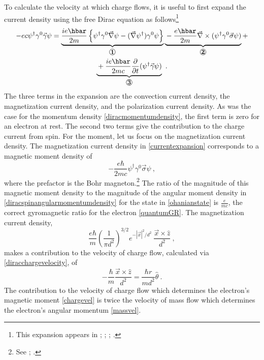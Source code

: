 \documentclass[12pt,secnumarabic,amsmath,amssymb,balancelastpage,nofootinbib]{article}
\begin{document}
To calculate the velocity at which charge flows, it is useful to first expand the current density using the free Dirac equation as follows\footnote{This expansion appears in \citet{gordon1928}; \citet[pg.\ 321--322]{frenkel}; \citet[pg.\ 479]{huang1952}; \citet[pg.\ 504]{ohanian}.}
 \begin{multline}
 -e c \psi^\dagger \gamma^{0} \vec{\gamma} \psi = \underbrace{\strut \frac{i e\hbar}{2 m}\left\{\psi^\dagger \gamma^0 \vec{\nabla} \psi - (\vec{\nabla} \psi^\dagger) \gamma^0\psi\right\}}_{\text{\large{\ding{172}}}}\underbrace{\strut  - \frac{e\hbar}{2 m} \vec{\nabla}\times(\psi^\dagger \gamma^0 \vec{\sigma}\psi)}_{\text{\large{\ding{173}}}} + \\
 \underbrace{\strut  +\frac{i e\hbar}{2 m c}\frac{\partial}{\partial t}(\psi^\dagger \vec{\gamma} \psi)}_{\text{\large{\ding{174}}}}\ .
\label{currentexpansion}
 \end{multline}
The three terms in the expansion are the convection current density, the magnetization current density, and the polarization current density.  As was the case for the momentum density \eqref{diracmomentumdensity}, the first term is zero for an electron at rest.  The second two terms give the contribution to the charge current from spin.  For the moment, let us focus on the magnetization current density.  The magnetization current density in \eqref{currentexpansion} corresponds to a magnetic moment density of
\begin{equation}
- \frac{e\hbar}{2 m c} \psi^\dagger \gamma^0 \vec{\sigma}\psi\ ,
\label{magneticmomentdensity}
\end{equation}
where the prefactor is the Bohr magneton.\footnote{See \citet[section 5.6]{jackson}; \citet[pg. 504]{ohanian}.}  The ratio of the magnitude of this magnetic moment density to the magnitude of the angular moment density in \eqref{diracspinangularmomentumdensity} for the state in \eqref{ohanianstate} is $\frac{e}{m c}$, the correct gyromagnetic ratio for the electron \eqref{quantumGR}.  The magnetization current density,
\begin{equation}
\frac{e \hbar}{m}\left(\frac{1}{\pi d^2}\right)^{3/2}e^{-|\vec{x}|^2/d^2}\ \frac{\vec{x}\times\hat{z}}{d^2}\ ,
\label{magcurrent}
\end{equation}
makes a contribution to the velocity of charge flow, calculated via \eqref{diracchargevelocity}, of
\begin{equation}
-\frac{\hbar}{m}\frac{\vec{x}\times\hat{z}}{d^2}=\frac{\hbar r}{m d^2} \hat{\theta}\ .
\label{chargevel}
\end{equation}
The contribution to the velocity of charge flow which determines the electron's magnetic moment \eqref{chargevel} is twice the velocity of mass flow which determines the electron's angular momentum \eqref{massvel}.
\end{document}
